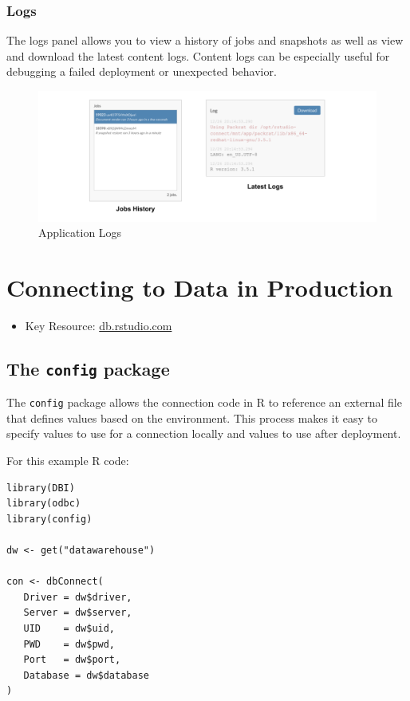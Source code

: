\documentclass[]{book}
\providecommand{\tightlist}{%
  \setlength{\itemsep}{0pt}\setlength{\parskip}{0pt}}
\theoremstyle{definition}
\theoremstyle{definition}
\theoremstyle{definition}
\theoremstyle{remark}
\begin{document}
\hypertarget{logs}{%
\subsection{Logs}\label{logs}}

The logs panel allows you to view a history of jobs and snapshots as
well as view and download the latest content logs. Content logs can be
especially useful for debugging a failed deployment or unexpected
behavior.

\begin{figure}
\centering
\includegraphics{imgs/deployment/rsc-logs.png}
\caption{Application Logs}
\end{figure}

\hypertarget{connecting-to-data-in-production}{%
\chapter{Connecting to Data in
Production}\label{connecting-to-data-in-production}}

\begin{itemize}
\tightlist
\item
  Key Resource: \url{db.rstudio.com}
\end{itemize}

\hypertarget{the-config-package}{%
\section{\texorpdfstring{The \texttt{config}
package}{The config package}}\label{the-config-package}}

The \texttt{config} package allows the connection code in R to reference
an external file that defines values based on the environment. This
process makes it easy to specify values to use for a connection locally
and values to use after deployment.

For this example R code:

\begin{verbatim}
library(DBI)
library(odbc)
library(config)

dw <- get("datawarehouse")

con <- dbConnect(
   Driver = dw$driver,
   Server = dw$server,
   UID    = dw$uid,
   PWD    = dw$pwd,
   Port   = dw$port,
   Database = dw$database
)
\end{verbatim}
\end{document}
